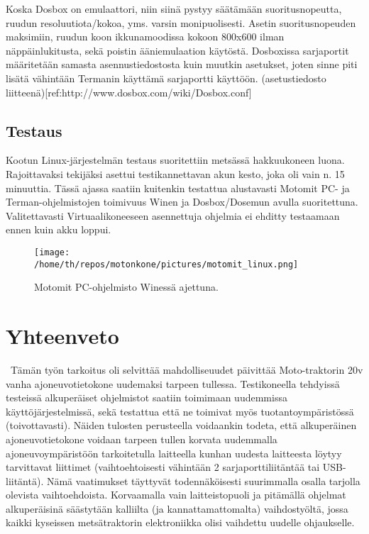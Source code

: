 \documentclass[11pt,a4paper,oneside,article]{memoir}
\begin{document}
Koska Dosbox on emulaattori, niin siinä pystyy säätämään
suoritusnopeutta, ruudun resoluutiota/kokoa, yms. varsin monipuolisesti.
Asetin suoritusnopeuden maksimiin, ruudun koon ikkunamoodissa kokoon
800x600 ilman näppäinlukitusta, sekä poistin ääniemulaation käytöstä.
Dosboxissa sarjaportit määritetään samasta asennustiedostosta kuin
muutkin asetukset, joten sinne piti lisätä vähintään Termanin käyttämä
sarjaportti käyttöön. (asetustiedosto
liitteenä){[}ref:http://www.dosbox.com/wiki/Dosbox.conf{]}



\section{Testaus}
Kootun Linux-järjestelmän testaus suoritettiin metsässä hakkuukoneen luona. Rajoittavaksi tekijäksi asettui testikannettavan akun kesto, joka oli vain n. 15 minuuttia. Tässä ajassa saatiin kuitenkin testattua alustavasti Motomit PC- ja Terman-ohjelmistojen toimivuus Winen ja Dosbox/Dosemun avulla suoritettuna. Valitettavasti Virtuaalikoneeseen asennettuja ohjelmia ei ehditty testaamaan ennen kuin akku loppui.

\begin{figure}[H]
\centering
\texttt{[image: /home/th/repos/motonkone/pictures/motomit\_linux.png]}
\caption{Motomit PC-ohjelmisto Winessä ajettuna.}
\end{figure}

\chapter{Yhteenveto}\
Tämän työn tarkoitus oli selvittää mahdolliseuudet päivittää
Moto-traktorin 20v vanha ajoneuvotietokone uudemaksi tarpeen tullessa.
Testikoneella tehdyissä testeissä alkuperäiset ohjelmistot saatiin
toimimaan uudemmissa käyttöjärjestelmissä, sekä testattua että ne
toimivat myös tuotantoympäristössä (toivottavasti). Näiden tulosten
perusteella voidaankin todeta, että alkuperäinen ajoneuvotietokone
voidaan tarpeen tullen korvata uudemmalla ajoneuvoympäristöön
tarkoitetulla laitteella kunhan uudesta laitteesta löytyy tarvittavat
liittimet (vaihtoehtoisesti vähintään 2 sarjaporttiliitäntää tai
USB-liitäntä). Nämä vaatimukset täyttyvät todennäköisesti suurimmalla
osalla tarjolla olevista vaihtoehdoista. Korvaamalla vain
laitteistopuoli ja pitämällä ohjelmat alkuperäisinä säästytään kalliilta
(ja kannattamattomalta) vaihdostyöltä, jossa kaikki kyseissen
metsätraktorin elektroniikka olisi vaihdettu uudelle ohjaukselle.
\end{document}
